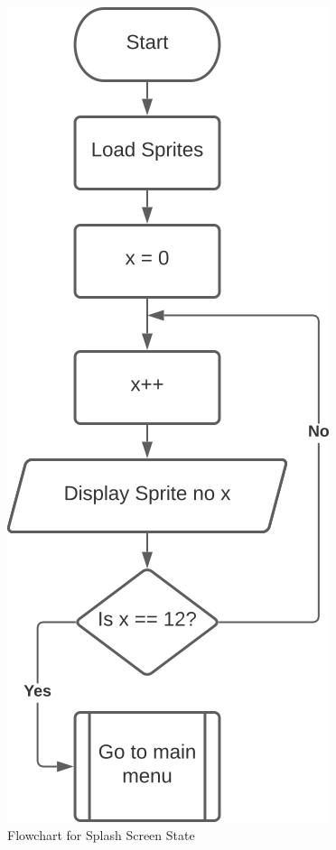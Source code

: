 \documentclass[main]{subfiles}
\begin{document}
        \begin{figure}[H]
            \centering
            \includegraphics[scale=0.5]{graphics/flowcharts/splash_screen.png}
            \caption{Flowchart for Splash Screen State}
            \label{fig:splash_screen}
        \end{figure}
\end{document}
